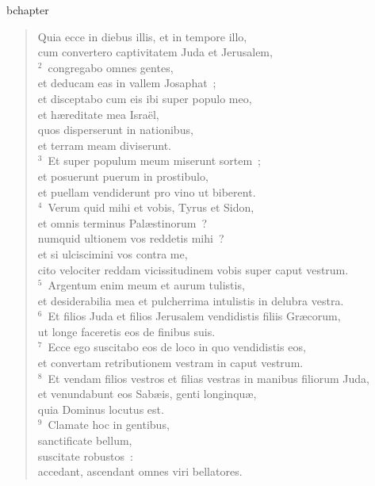 bchapter\begin{verse}\vspace{-19pt}Quia ecce in diebus illis, et in tempore illo,\\ cum convertero captivitatem Juda et Jerusalem,\\
${}^{2}$~congregabo omnes gentes,\\ et deducam eas in vallem Josaphat~;\\ et disceptabo cum eis ibi super populo meo,\\ et h\ae reditate mea Isra\"el,\\ quos disperserunt in nationibus,\\ et terram meam diviserunt.\\
${}^{3}$~Et super populum meum miserunt sortem~;\\ et posuerunt puerum in prostibulo,\\ et puellam vendiderunt pro vino ut biberent.\\
${}^{4}$~Verum quid mihi et vobis, Tyrus et Sidon,\\ et omnis terminus Pal\ae stinorum~?\\ numquid ultionem vos reddetis mihi~?\\ et si ulciscimini vos contra me,\\ cito velociter reddam vicissitudinem vobis super caput vestrum.\\
${}^{5}$~Argentum enim meum et aurum tulistis,\\ et desiderabilia mea et pulcherrima intulistis in delubra vestra.\\
${}^{6}$~Et filios Juda et filios Jerusalem vendidistis filiis Gr\ae corum,\\ ut longe faceretis eos de finibus suis.\\
${}^{7}$~Ecce ego suscitabo eos de loco in quo vendidistis eos,\\ et convertam retributionem vestram in caput vestrum.\\
${}^{8}$~Et vendam filios vestros et filias vestras in manibus filiorum Juda,\\ et venundabunt eos Sab\ae is, genti longinqu\ae ,\\ quia Dominus locutus est.\\
${}^{9}$~Clamate hoc in gentibus,\\ sanctificate bellum,\\ suscitate robustos~:\\ accedant, ascendant omnes viri bellatores.\\

\end{verse}

